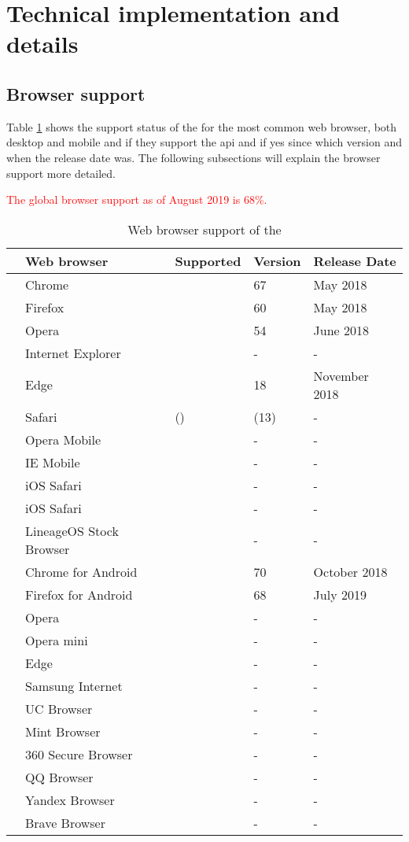 \section{Technical implementation and details}

\newpage
\subsection{Browser support}

Table \ref{tab:browser-support} shows the support status of the \wa{} for the most common web browser, both desktop and mobile and if they support the \gls{api} and if yes since which version and when the release date was. The following subsections will explain the browser support more detailed.

\textcolor{red}{The global browser support as of August 2019 is 68\%.}
\begin{table}[ht]
\renewcommand\thetable{1}
\begin{tabularx}{\textwidth}{l|p{4.8cm}|p{2cm}|p{2cm}|p{3.3cm}}
	& Web browser & Supported & Version & Release Date \\
	\hline
	\parbox[t]{2mm}{} & Chrome & \OK & 67 & May 2018 \\
	& Firefox & \OK & 60 & May 2018 \\
	& Opera & \OK & 54 & June 2018 \\
	& Internet Explorer & \NOOK & - & - \\
	& Edge & \OK & 18 & November 2018 \\
	& Safari & (\OK) & (13) & - \\
	\hline
	\parbox[t]{2mm}{} & Opera Mobile & \NOOK & - & - \\
	& IE Mobile & \NOOK & - & - \\
	& iOS Safari & \NOOK & - & - \\
	& iOS Safari & \NOOK & - & - \\
	\hline
	\parbox[t]{2mm}{} & LineageOS Stock Browser & \NOOK & - & - \\
	& Chrome for Android & \OK & 70 & October 2018 \\
	& Firefox for Android & \OK & 68 & July 2019 \\
	& Opera & \NOOK & - & - \\
	& Opera mini & \NOOK & - & - \\
	& Edge & \NOOK & - & - \\
	& Samsung Internet & \NOOK & - & - \\
	& UC Browser & \NOOK & - & - \\	
	& Mint Browser & \NOOK & - & - \\
	& 360 Secure Browser & \NOOK & - & - \\
	& QQ Browser & \NOOK & - & - \\
	& Yandex Browser & \NOOK & - & - \\
	& Brave Browser & \NOOK & - & -
\end{tabularx}
\caption[Web browser support of the \wa{}]{Web browser support of the \wa{}\footnotemark} \label{tab:browser-support}
\end{table}
